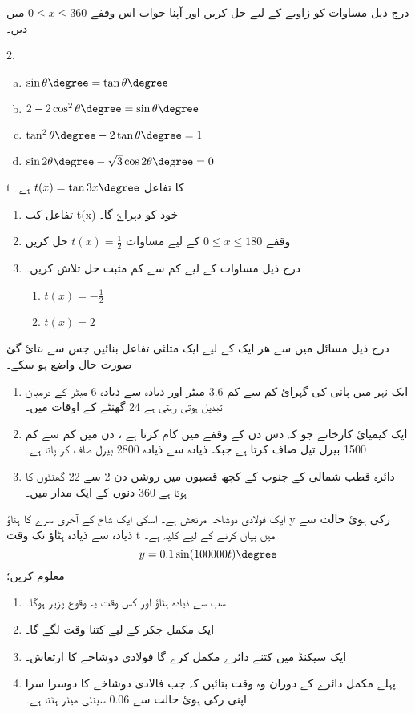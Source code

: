 درج ذیل مساوات کو زاویے کے لیے حل کریں اور آپنا جواب اس وقفے \(0\le x\le 360\)  میں دیں۔
\begin{multicols}{2.}
\begin{enumerate}[a.]
\item   \(\sin\theta\degree=\tan\theta\degree \)
\item    \(2-2\cos^2\theta\degree=\sin\theta\degree \)
\item     \(\tan^2\theta\degree-2\tan\theta\degree=1 \)
\item    \(\sin2\theta\degree-\sqrt{3}\cos2\theta\degree=0 \)
\end{enumerate}
\end{multicols}
t 
کا تفاعل \(t(x)=\tan3x\degree \) ہے۔
\begin{enumerate}
\item
تفاعل  کب t(x)  خود  کو  دہراۓ گا۔ 
\item
 وقفے   \(0\leq x\leq180\)  کے لیے  مساوات  \(t(x)=\frac{1}{2} \) حل کریں 
\item
درج ذیل مساوات کے لیے کم سے کم مثبت حل تلاش کریں۔
\begin{enumerate}
\item  \(t(x)=-\frac{1}{2}\)
\item  \(t(x)=2\)
\end{enumerate}

\end{enumerate}

درج ذیل مسائل میں سے ھر ایک کے لیے ایک مثلثی تفاعل بنائیں جس سے بتائ گئ صورت حال واضع ہو سکے۔
\begin{enumerate}
\item
 ایک نہر میں پانی کی گہرائ کم سے کم 3.6 میٹر اور ذیادہ سے ذیادہ 6 میٹر کے درمیان تبدیل ہوتی رہتی ہے 24 گھنٹے کے اوقات میں۔
\item
ایک کیمیائ کارخانے جو کہ دس دن کے وقفے میں کام کرتا ہے ، دن میں کم سے کم 1500 بیرل تیل صاف کرتا ہے جبکہ ذیادہ سے ذیادہ 2800 بیرل صاف کر پاتا ہے۔
\item
دائرہ قطب شمالی کے جنوب کے کچھ قصبوں میں روشن دن 2 سے 22 گھنٹوں کا ہوتا ہے 360 دنوں کے ایک مدار میں۔
\end{enumerate}

ایک فولادی دوشاخہ مرتعش ہے۔ اسکی ایک شاخ کے آخری سرے کا ہٹاؤ  y رکی ہوئ حالت سے ذیادہ سے ذیادہ ہٹاؤ تک وقت t میں بیان کرنے کے لیے کلیہ ہے۔\[y=0.1 \sin(100000t)\degree \]
معلوم کریں؛
\begin{enumerate}
\item
 سب سے ذیادہ ہٹاؤ اور کس وقت یہ وقوع پزیر ہوگا۔
\item    
 ایک مکمل چکر کے لیے کتنا وقت لگے گا۔
\item    
ایک سیکنڈ میں کتنے دائرے مکمل کرے گا فولادی دوشاخے کا  ارتعاش۔
\item  
 پہلے مکمل دائرے کے دوران وہ وقت بتائیں کہ جب فالادی دوشاخے کا دوسرا سرا اپنی رکی ہوئ حالت سے 0.06 سینٹی میٹر ہٹتا ہے۔ 
\end{enumerate}

